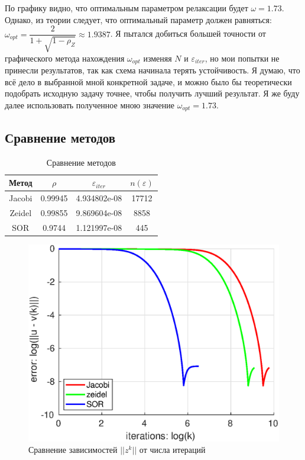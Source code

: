 \documentclass[12pt]{article}
\begin{document}
По графику видно, что оптимальным параметром релаксации будет $\omega = 1.73$. Однако, из теории следует, что оптимальный параметр должен равняться: $\omega_{opt} = \dfrac{2}{1+\sqrt{1 - \rho_{Z}}} \approx 1.9387$. Я пытался добиться большей точности от графического метода нахождения $\omega_{opt}$ изменяя $N$ и $\varepsilon_{iter}$, но мои попытки не принесли результатов, так как схема начинала терять устойчивость. Я думаю, что всё дело в выбранной мной конкретной задаче, и можно было бы теоретически подобрать исходную задачу точнее, чтобы получить лучший результат. Я же буду далее использовать полученное мною значение $\omega_{opt} = 1.73$.

\subsection{Сравнение методов}

\begin{table}[H]
\caption{Сравнение методов}
\begin{center}
\begin{tabular}{|c|c|c|c|}
\hline
Метод & $\rho$ & $\varepsilon_{iter}$ & $n(\varepsilon)$ \\
\hline
Jacobi & 0.99945 & 4.934802e-08 & 17712 \\
\hline
Zeidel & 0.99855 & 9.869604e-08 & 8858 \\
\hline
SOR & 0.9744 & 1.121997e-08 & 445 \\
\hline
\end{tabular}
\end{center}
\end{table}


\begin{figure}[H]
\centerline{\includegraphics[scale = 0.8]{compare.eps}}
\caption{Сравнение зависимостей $||z^k||$ от числа итераций}
\end{figure}
\end{document}
